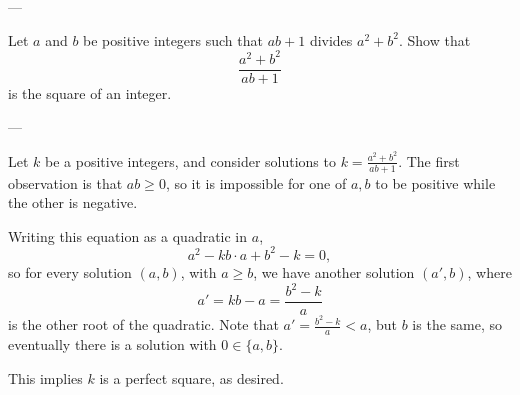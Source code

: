 
---

Let $a$ and $b$ be positive integers such that $ab+1$ divides $a^2+b^2$. Show that \[\frac{a^2+b^2}{ab+1}\]
is the square of an integer.

---

Let $k$ be a positive integers, and consider solutions to $k=\frac{a^2+b^2}{ab+1}$. The first observation is that $ab\ge0$, so it is impossible for one of $a,b$ to be positive while the other is negative.

Writing this equation as a quadratic in $a$, \[a^2-kb\cdot a+b^2-k=0,\]
so for every solution $(a,b)$, with $a\ge b$, we have another solution $(a',b)$, where \[a'=kb-a=\frac{b^2-k}a\]
is the other root of the quadratic. Note that $a'=\frac{b^2-k}a<a$, but $b$ is the same, so eventually there is a solution with $0\in\{a,b\}$.

This implies $k$ is a perfect square, as desired.


